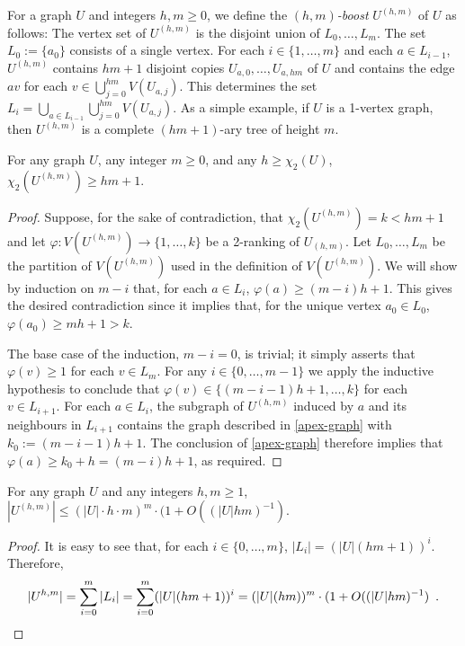 \documentclass[kpfonts]{patmorin}
\newcommand{\trn}{\chi_2}
\theoremstyle{named}
\begin{document}
For a graph $U$ and integers $h,m\ge 0$, we define the \emph{$(h,m)$-boost} $U^{(h,m)}$ of $U$ as follows: The vertex set of $U^{(h,m)}$ is the disjoint union of $L_0,\ldots,L_m$.  The set $L_0:=\{a_0\}$ consists of a single vertex. For each $i\in\{1,\ldots,m\}$ and each $a\in L_{i-1}$, $U^{(h,m)}$ contains $hm+1$ disjoint copies $U_{a,0},\ldots,U_{a,hm}$ of $U$ and contains the edge $av$ for each $v\in\bigcup_{j=0}^{hm} V(U_{a,j})$.  This determines the set $L_i=\bigcup_{a\in L_{i-1}}\bigcup_{j=0}^{hm} V(U_{a,j})$.  As a simple example, if $U$ is a 1-vertex graph, then $U^{(h,m)}$ is a complete $(hm+1)$-ary tree of height $m$.

\begin{lem}\label{boost}
    For any graph $U$, any integer $m\ge 0$, and any $h\ge\trn(U)$, $\trn(U^{(h,m)})\ge hm +1$.
\end{lem}

\begin{proof}
    Suppose, for the sake of contradiction, that $\trn(U^{(h,m)})=k<hm+1$ and let $\varphi:V(U^{(h,m)})\to\{1,\ldots,k\}$ be a 2-ranking of $U_{(h,m)}$.  Let $L_0,\ldots,L_{m}$ be the partition of $V(U^{(h,m)})$ used in the definition of $V(U^{(h,m)})$.
    We will show by induction on $m-i$ that, for each $a\in L_{i}$, $\varphi(a)\ge(m-i)h+1$. This gives the desired contradiction since it implies that, for the unique vertex $a_0\in L_0$, $\varphi(a_0)\ge m h+1 > k$.

    The base case of the induction, $m-i=0$, is trivial; it simply asserts that $\varphi(v)\ge 1$ for each $v\in L_m$.  For any $i\in\{0,\ldots,m-1\}$ we apply the inductive hypothesis to conclude that $\varphi(v)\in\{(m-i-1)h+1,\ldots,k\}$ for each $v\in L_{i+1}$.  For each $a\in L_i$, the subgraph of $U^{(h,m)}$ induced by $a$ and its neighbours in $L_{i+1}$ contains the graph described in \cref{apex-graph} with $k_0:=(m-i-1)h+1$.  The conclusion of \cref{apex-graph} therefore implies that $\varphi(a)\ge k_0+h=(m-i)h+1$, as required.
\end{proof}

\begin{lem}\label{boost-size}
    For any graph $U$ and any integers $h,m \ge 1$, $|U^{(h,m)}| \le (|U|\cdot h\cdot m)^{m}\cdot (1+O((|U|hm)^{-1})$.
\end{lem}

\begin{proof}
    It is easy to see that, for each $i\in \{0,\ldots,m\}$, $|L_i|=(|U|(hm+1))^i$.  Therefore,
    \[ |U^{h,m}| = \sum_{i=0}^m |L_i| = \sum_{i=0}^m (|U|(hm+1))^i = (|U|(hm))^{m}\cdot (1+O((|U|hm)^{-1}) \enspace . \qedhere
    \]
\end{proof}
\end{document}
